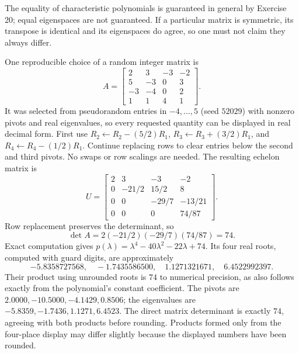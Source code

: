 The equality of characteristic polynomials is guaranteed in general by Exercise 20; equal eigenspaces are not guaranteed. If a particular matrix is symmetric, its transpose is identical and its eigenspaces do agree, so one must not claim they always differ.


One reproducible choice of a random integer matrix is
\[
 A=\begin{bmatrix}2&3&-3&-2\\5&-3&0&3\\-3&-4&0&2\\1&1&4&1\end{bmatrix}.
\]
It was selected from pseudorandom entries in $-4,\ldots,5$
(seed $52029$) with nonzero pivots and real eigenvalues, so every
requested quantity can be displayed in real decimal form.
First use $R_2\leftarrow R_2-(5/2)R_1$,
$R_3\leftarrow R_3+(3/2)R_1$, and
$R_4\leftarrow R_4-(1/2)R_1$. Continue replacing rows to clear
entries below the second and third pivots. No swaps or row scalings
are needed. The resulting echelon matrix is
\[
 U=\begin{bmatrix}2&3&-3&-2\\0&-21/2&15/2&8\\0&0&-29/7&-13/21\\0&0&0&74/87\end{bmatrix}.
\]
Row replacement preserves the determinant, so
\[
 \det A=2(-21/2)(-29/7)(74/87)=74.
\]
Exact computation gives $p(\lambda)=\lambda^4-40\lambda^2-22\lambda+74$.
Its four real roots, computed with guard digits, are approximately
\[
 -5.8358727568,\quad -1.7435586500,\quad
 1.1271321671,\quad6.4522992397.
\]
Their product using unrounded roots is $74$ to numerical precision,
as also follows exactly from the polynomial's constant coefficient.
The pivots are $2.0000,-10.5000,-4.1429,0.8506$; the eigenvalues
are $-5.8359,-1.7436,1.1271,6.4523$.
The direct matrix determinant is exactly $74$, agreeing with both
products before rounding. Products formed only from the four-place
display may differ slightly because the displayed numbers have been rounded.

